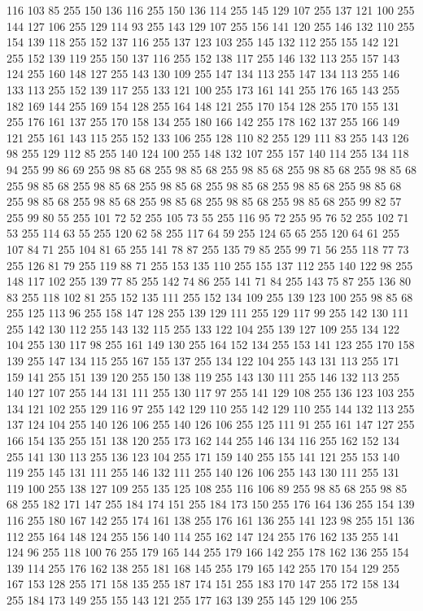 116 103 85 255 150 136 116 255 150 136 114 255 145 129 107 255 137 121 100 255 144 127 106 255 129 114 93 255 143 129 107 255 156 141 120 255 146 132 110 255 154 139 118 255 152 137 116 255 137 123 103 255 145 132 112 255 155 142 121 255 152 139 119 255 150 137 116 255 152 138 117 255 146 132 113 255 157 143 124 255 160 148 127 255 143 130 109 255 147 134 113 255 147 134 113 255 146 133 113 255 152 139 117 255 133 121 100 255 173 161 141 255 176 165 143 255 182 169 144 255 169 154 128 255 164 148 121 255 170 154 128 255 170 155 131 255 176 161 137 255 170 158 134 255 180 166 142 255 178 162 137 255 166 149 121 255 161 143 115 255 152 133 106 255 128 110 82 255 129 111 83 255 143 126 98 255 129 112 85 255 140 124 100 255 148 132 107 255 157 140 114 255 134 118 94 255 99 86 69 255 98 85 68 255 98 85 68 255 98 85 68 255 98 85 68 255 98 85 68 255 98 85 68 255 98 85 68 255 98 85 68 255 98 85 68 255 98 85 68 255 98 85 68 255 98 85 68 255 98 85 68 255 98 85 68 255
98 85 68 255 98 85 68 255 99 82 57 255 99 80 55 255 101 72 52 255 105 73 55 255 116 95 72 255 95 76 52 255 102 71 53 255 114 63 55 255 120 62 58 255 117 64 59 255 124 65 65 255 120 64 61 255 107 84 71 255 104 81 65 255 141 78 87 255 135 79 85 255 99 71 56 255 118 77 73 255 126 81 79 255 119 88 71 255 153 135 110 255 155 137 112 255 140 122 98 255 148 117 102 255 139 77 85 255 142 74 86 255 141 71 84 255 143 75 87 255 136 80 83 255 118 102 81 255 152 135 111 255 152 134 109 255 139 123 100 255 98 85 68 255 125 113 96 255 158 147 128 255 139 129 111 255 129 117 99 255 142 130 111 255 142 130 112 255 143 132 115 255 133 122 104 255 139 127 109 255 134 122 104 255 130 117 98 255 161 149 130 255 164 152 134 255 153 141 123 255 170 158 139 255 147 134 115 255 167 155 137 255 134 122 104 255 143 131 113 255 171 159 141 255 151 139 120 255 150 138 119 255 143 130 111 255 146 132 113 255 140 127 107 255 144 131 111 255 130 117 97 255 141 129 108 255
136 123 103 255 134 121 102 255 129 116 97 255 142 129 110 255 142 129 110 255 144 132 113 255 137 124 104 255 140 126 106 255 140 126 106 255 125 111 91 255 161 147 127 255 166 154 135 255 151 138 120 255 173 162 144 255 146 134 116 255 162 152 134 255 141 130 113 255 136 123 104 255 171 159 140 255 155 141 121 255 153 140 119 255 145 131 111 255 146 132 111 255 140 126 106 255 143 130 111 255 131 119 100 255 138 127 109 255 135 125 108 255 116 106 89 255 98 85 68 255 98 85 68 255 182 171 147 255 184 174 151 255 184 173 150 255 176 164 136 255 154 139 116 255 180 167 142 255 174 161 138 255 176 161 136 255 141 123 98 255 151 136 112 255 164 148 124 255 156 140 114 255 162 147 124 255 176 162 135 255 141 124 96 255 118 100 76 255 179 165 144 255 179 166 142 255 178 162 136 255 154 139 114 255 176 162 138 255 181 168 145 255 179 165 142 255 170 154 129 255 167 153 128 255 171 158 135 255 187 174 151 255 183 170 147 255 172 158 134 255 184 173 149 255 155 143 121 255 177 163 139 255 145 129 106 255
